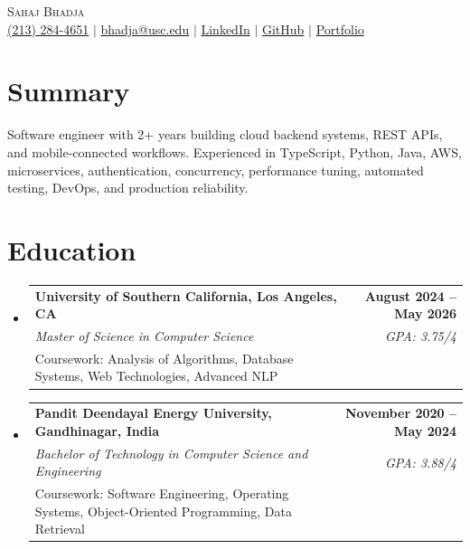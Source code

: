 \documentclass[letterpaper,10pt]{article}
\makeatletter
\newcommand{\resumeEduSubheading}[5]{\vspace{-1pt}\item\begin{tabular*}{1.0\textwidth}[t]{l@{\extracolsep{\fill}}r}\textbf{#1} & \textbf{\small #2} \\\textit{\small #3} & \textit{\small #4} \\\small #5 & \\\end{tabular*}\vspace{-4pt}}
\newcommand{\resumeSubHeadingListStart}{\begin{itemize}[leftmargin=0.0in,label={}]}
\newcommand{\resumeSubHeadingListEnd}{\end{itemize}}
\makeatother
\begin{document}
\begin{center}
  {\Huge \scshape Sahaj Bhadja} \\ \vspace{1pt}
  \small \href{tel:2132844651}{(213) 284-4651} $|$ \href{mailto:bhadja@usc.edu}{bhadja@usc.edu} $|$
  \href{https://www.linkedin.com/in/sahaj-bhadja/}{LinkedIn} $|$ \href{https://github.com/sahaj-bhadja}{GitHub} $|$ \href{https://sahaj-bhadja.github.io/}{Portfolio}
\end{center}
\vspace{-13pt}

\section{Summary}
\small Software engineer with 2+ years building cloud backend systems, REST APIs, and mobile-connected workflows. Experienced in TypeScript, Python, Java, AWS, microservices, authentication, concurrency, performance tuning, automated testing, DevOps, and production reliability.

\section{Education}
\resumeSubHeadingListStart
  \resumeEduSubheading{University of Southern California, Los Angeles, CA}{August 2024 -- May 2026}{Master of Science in Computer Science}{GPA: 3.75/4}{Coursework: Analysis of Algorithms, Database Systems, Web Technologies, Advanced NLP}
  \vspace{2pt}
  \resumeEduSubheading{Pandit Deendayal Energy University, Gandhinagar, India}{November 2020 -- May 2024}{Bachelor of Technology in Computer Science and Engineering}{GPA: 3.88/4}{Coursework: Software Engineering, Operating Systems, Object-Oriented Programming, Data Retrieval}
\resumeSubHeadingListEnd
\end{document}
